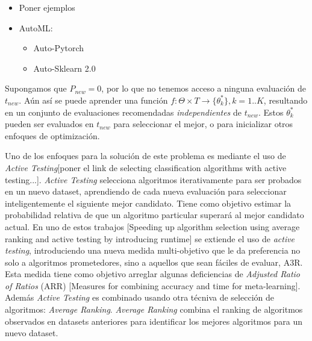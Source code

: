 \begin{itemize}
	\item Poner ejemplos
		\item AutoML: \begin{itemize}
			\item Auto-Pytorch
			\item Auto-Sklearn 2.0
		\end{itemize}
\end{itemize}

Supongamos que $P_{new} = 0$, por lo que no tenemos acceso a ninguna evaluación de $t_{new}$. Aún así se puede aprender una función $f: \Theta \times T \rightarrow \{\theta^*_k\}, k=1..K$, resultando en un conjunto de evaluaciones recomendadas \textit{independientes} de $t_{new}$. Estos $\theta^*_k$ pueden ser evaluados en $t_{new}$ para seleccionar el mejor, o para inicializar otros enfoques de optimización.

Uno de los enfoques para la solución de este problema es mediante el uso de \textit{Active Testing}[poner el link de selecting classification algorithms with active testing...]. \textit{Active Testing} selecciona algoritmos iterativamente para ser probados en un nuevo dataset, aprendiendo de cada nueva evaluación para seleccionar inteligentemente el siguiente mejor candidato. Tiene como objetivo estimar la probabilidad relativa de que un algoritmo particular superará al mejor candidato actual. En uno de estos trabajos [Speeding up algorithm selection using average ranking and active testing by introducing runtime] se extiende el uso de \textit{active testing}, introduciendo una nueva medida multi-objetivo que le da preferencia no solo a algoritmos prometedores, sino a aquellos que sean fáciles de evaluar, A3R. Esta medida tiene como objetivo arreglar algunas deficiencias de \textit{Adjusted Ratio of Ratios} (ARR) [Measures for combining accuracy and time for meta-learning]. Además \textit{Active Testing} es combinado usando otra técniva de selección de algoritmos: \textit{Average Ranking}. \textit{Average Ranking} combina el ranking de algoritmos observados en datasets anteriores para identificar los mejores algoritmos para un nuevo dataset.

